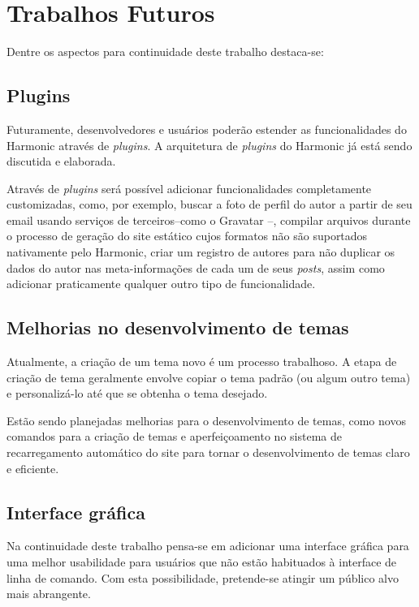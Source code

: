 \documentclass[ppginf, pep]{esinucpel}
\begin{document}
\section{Trabalhos Futuros}

Dentre os aspectos para continuidade deste trabalho destaca-se: 

\subsection{Plugins}

Futuramente, desenvolvedores e usuários poderão estender as funcionalidades do Harmonic através de \textit{plugins}. A arquitetura de \textit{plugins} do Harmonic já está sendo discutida e elaborada.

Através de \textit{plugins} será possível adicionar funcionalidades completamente customizadas, como, por exemplo, buscar a foto de perfil do autor a partir de seu email usando serviços de terceiros--como o Gravatar \cite{gravatar}--, compilar arquivos durante o processo de geração do site estático cujos formatos não são suportados nativamente pelo Harmonic, criar um registro de autores para não duplicar os dados do autor nas meta-informações de cada um de seus \textit{posts}, assim como adicionar praticamente qualquer outro tipo de funcionalidade.

\subsection{Melhorias no desenvolvimento de temas}

Atualmente, a criação de um tema novo é um processo trabalhoso. A etapa de criação de tema geralmente envolve copiar o tema padrão (ou algum outro tema) e personalizá-lo até que se obtenha o tema desejado.

Estão sendo planejadas melhorias para o desenvolvimento de temas, como novos comandos para a criação de temas e aperfeiçoamento no sistema de recarregamento automático do site para tornar o desenvolvimento de temas claro e eficiente.

\subsection{Interface gráfica}

Na continuidade deste trabalho pensa-se em adicionar uma interface gráfica para uma melhor usabilidade para usuários que não estão habituados à interface de linha de comando. Com esta possibilidade, pretende-se atingir um público alvo mais abrangente.
\end{document}
